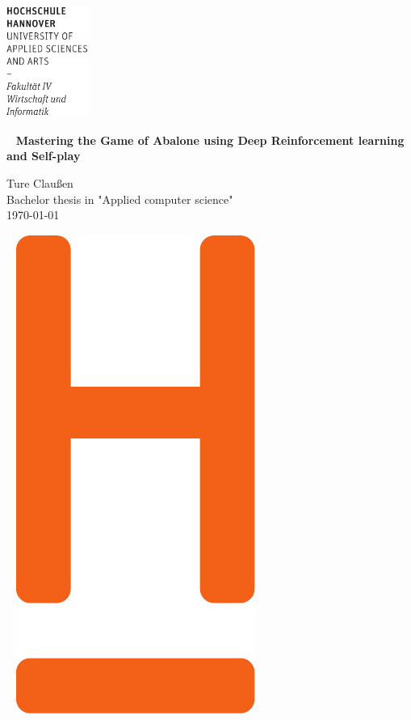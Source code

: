 \documentclass[fontsize=12pt,paper=a4,twoside,parskip=half-,headsepline,headinclude, abstract=on]{scrreprt}
\begin{document}
\thispagestyle{empty}
\includegraphics[width=0.2\textwidth]{../lib/Wortmarke_WI_schwarz}

{  ~ \sffamily
    \vfill
    {\Huge\bfseries Mastering the Game of Abalone using Deep Reinforcement learning and Self-play}
    \bigskip

    {\Large
        Ture Claußen \\[2ex]
        Bachelor thesis in "Applied computer science"
        \\[5ex]
        \today }
}
\vfill

~ \hfill
\includegraphics[height=0.3\paperheight]{../lib/H_WI_Pantone1665}

\vspace*{-3cm}
\end{document}
